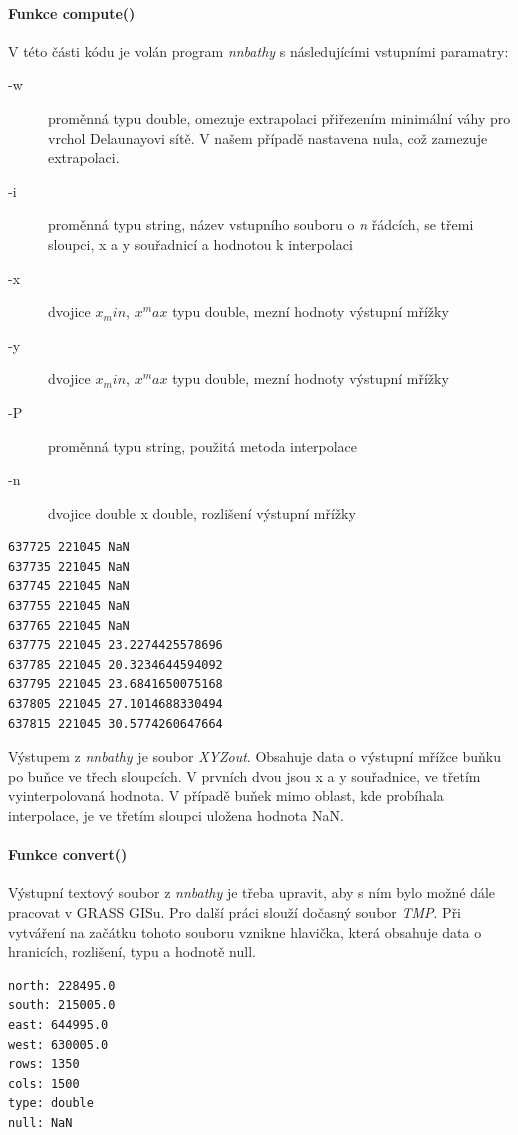 \documentclass[12pt,a4paper]{article}
\begin{document}
\paragraph{Funkce compute()}
V této části kódu je volán program \textit{nnbathy} s následujícími vstupními paramatry:
\begin{description}
\item[-w]{proměnná typu double, omezuje extrapolaci přiřezením minimální váhy pro vrchol Delaunayovi sítě. V našem případě nastavena nula, což zamezuje extrapolaci.}
\item[-i]{proměnná typu string, název vstupního souboru o \textit{n} řádcích, se třemi sloupci, x a y souřadnicí a hodnotou k interpolaci}
\item[-x]{dvojice $x_min$, $x^max$ typu double, mezní hodnoty výstupní mřížky}
\item[-y]{dvojice $x_min$, $x^max$ typu double, mezní hodnoty výstupní mřížky}
\item[-P]{proměnná typu string, použitá metoda interpolace}
\item[-n]{dvojice double x double, rozlišení výstupní mřížky}
\end{description}

\begin{lstlisting}
637725 221045 NaN
637735 221045 NaN
637745 221045 NaN
637755 221045 NaN
637765 221045 NaN
637775 221045 23.2274425578696
637785 221045 20.3234644594092
637795 221045 23.6841650075168
637805 221045 27.1014688330494
637815 221045 30.5774260647664
\end{lstlisting}

Výstupem z \textit{nnbathy} je soubor \textit{XYZout}. Obsahuje data o výstupní mřížce buňku po buňce ve třech sloupcích. V prvních dvou jsou x a y souřadnice, ve třetím vyinterpolovaná hodnota. V případě buňek mimo oblast, kde probíhala interpolace, je ve třetím sloupci uložena hodnota NaN.



\paragraph{Funkce convert()}
Výstupní textový soubor z \textit{nnbathy} je třeba upravit, aby s ním bylo možné dále pracovat v GRASS GISu. Pro další práci slouží dočasný soubor \textit{TMP}. Při vytváření na začátku tohoto souboru vznikne hlavička, která obsahuje data o hranicích, rozlišení, typu a hodnotě null.

\begin{lstlisting}
north: 228495.0
south: 215005.0
east: 644995.0
west: 630005.0
rows: 1350
cols: 1500
type: double
null: NaN
\end{lstlisting}
\end{document}
